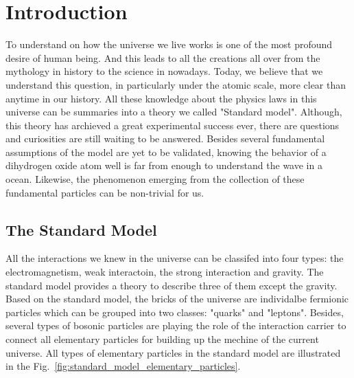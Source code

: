 
\chapter{Introduction} \label{chap:intro}

To understand on how the universe we live works is one of the most profound desire of human being. And this leads to all the creations all over from the mythology in history to the science in nowadays. Today, we believe that we understand this question, in particularly under the atomic scale, more clear than anytime in our history. All these knowledge about the physics laws in this universe can be summaries into a theory we called "Standard model". Although, this theory has archieved a great experimental success ever, there are questions and curiosities are still waiting to be answered. Besides several fundamental assumptions of the model are yet to be validated, knowing the behavior of a dihydrogen oxide atom well is far from enough to understand the wave in a ocean. Likewise, the phenomenon emerging from the collection of these fundamental particles can be non-trivial for us.



\section{The Standard Model}\label{sec:standard_model}
All the interactions we knew in the universe can be classifed into four types: the electromagnetism, weak interactoin, the strong interaction and gravity. The standard model provides a theory to describe three of them except the gravity. Based on the standard model, the bricks of the universe are individalbe fermionic particles which can be grouped into two classes: "quarks" and "leptons". Besides, several types of bosonic particles are playing the role of the interaction carrier to connect all elementary particles for building up the mechine of the current universe. All types of elementary particles in the standard model are illustrated in the Fig.~\ref{fig:standard_model_elementary_particles}. 

